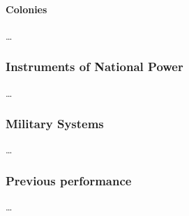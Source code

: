 \paragraph{Colonies}

\ldots

\subsubsection{Instruments of National Power}


\ldots

\subsubsection{Military Systems}

\ldots

\subsubsection{Previous performance}

\ldots
